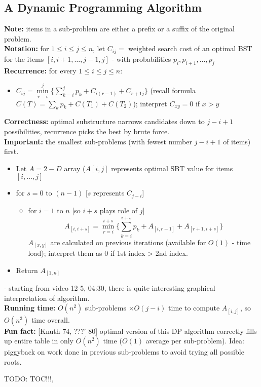 \documentclass{scrartcl}
\begin{document}
\subsection{A Dynamic Programming Algorithm}
\label{sec:12-4}
{\bf Note: } items in a sub-problem are either a prefix or a suffix of the
original problem.\\
{\bf Notation: } for $1 \leq i \leq j \leq n$, let $C_{ij} = $ weighted search
cost of an optimal BST for the items $[i, i+1, \dots, j-1, j]$ - with
probabilities $p_i, p_{i+1}, \dots, p_j$\\
{\bf Recurrence: } for every $1 \leq i \leq j \leq n$:
\begin{itemize}
\item $C_{ij} = \min \limits_{r-i}^j \{\sum\limits_{k=i}^j p_k + C_{i (r-1)} +
  C_{r+1 j}  \} $ (recall formula $C(T) = \sum \limits_k p_k + C(T_1) +
  C(T_2)$); interpret $C_{xy} = 0$ if $x > y$
\end{itemize}
{\bf Correctness: } optimal substructure narrows candidates down to $j -i + 1$
possibilities, recurrence picks the best by brute force.\\
{\bf Important:  } the smallest sub-problems (with fewest number $j-i+1$ of
items) first.\\
\begin{itemize}
\item Let $A = 2-D$ array ($A[i,j]$ represents optimal SBT value for items $[i,
  \dots, j]$
\item for $s = 0$ to $(n-1)$ [$s$ represents $C_{j-i}$]
  \begin{itemize}
  \item for $i = 1$ to $n$ [so $i+s$ plays role of $j$]
    $$A_{[i, i+s]} = \min_{r=i}^{i+s} \{\sum_{k=i}^{i+s}p_k + A_{[i, r-1]} +
    A_{[r+1, i+s]}\}$$ 
$A_{[x, y]}$ are calculated on previous iterations (available for $O(1)$ - time
load); interpret them as $0$ if 1st index > 2nd index.
  \end{itemize}
\item Return $A_{[1, n]}$
\end{itemize}
- starting from video 12-5, 04:30, there is quite interesting graphical
interpretation of algorithm.\\
{\bf Running time: } $O(n^2)$ sub-problems $\times O(j-i)$ time to compute
$A_{[i, j]}$, so $O(n^3)$ time overall.\\
{\bf Fun fact: } [Knuth 74, ???' 80] optimal version of this DP algorithm
correctly fills up entire table in only $O(n^2)$ time ($O(1)$ average per
sub-problem). Idea: piggyback on work done in previous sub-problems to avoid
trying all possible roots.


TODO: TOC!!!,
\end{document}
